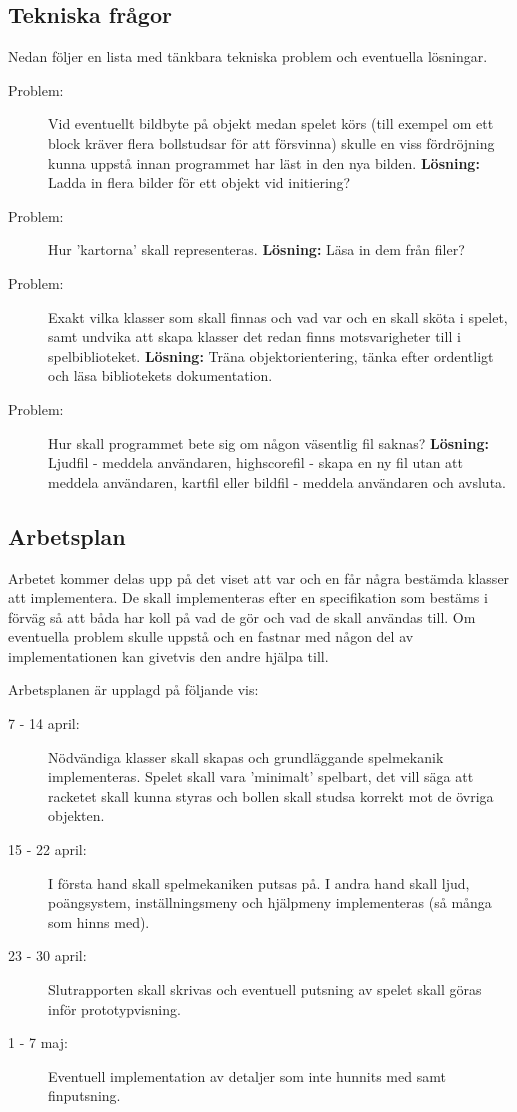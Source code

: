 \documentclass[11pt,a4paper]{article}
\begin{document}
\subsection{Tekniska frågor}
Nedan följer en lista med tänkbara tekniska problem och eventuella lösningar.
\begin{description}
	\item[Problem:] Vid eventuellt bildbyte på objekt medan spelet körs (till exempel om ett block kräver flera bollstudsar för att försvinna) skulle en viss fördröjning kunna uppstå innan programmet har läst in den nya bilden. \textbf{Lösning:} Ladda in flera bilder för ett objekt vid initiering?
	\item[Problem:] Hur 'kartorna' skall representeras. \textbf{Lösning:} Läsa in dem från filer?
	\item[Problem:] Exakt vilka klasser som skall finnas och vad var och en skall sköta i spelet, samt undvika att skapa klasser det redan finns motsvarigheter till i spelbiblioteket. \textbf{Lösning:} Träna objektorientering, tänka efter ordentligt och läsa bibliotekets dokumentation.
	\item[Problem:] Hur skall programmet bete sig om någon väsentlig fil saknas? \textbf{Lösning:} Ljudfil - meddela användaren, highscorefil - skapa en ny fil utan att meddela användaren, kartfil eller bildfil - meddela användaren och avsluta.
\end{description}

\subsection{Arbetsplan}
Arbetet kommer delas upp på det viset att var och en får några bestämda klasser att implementera. De skall implementeras efter en specifikation som bestäms i förväg så att båda har koll på vad de gör och vad de skall användas till. Om eventuella problem skulle uppstå och en fastnar med någon del av implementationen kan givetvis den andre hjälpa till.

Arbetsplanen är upplagd på följande vis:

\begin{description}
	\item[7 - 14 april:] Nödvändiga klasser skall skapas och grundläggande spelmekanik implementeras. Spelet skall vara 'minimalt' spelbart, det vill säga att racketet skall kunna styras och bollen skall studsa korrekt mot de övriga objekten.
	\item[15 - 22 april:] I första hand skall spelmekaniken putsas på. I andra hand skall ljud, poängsystem, inställningsmeny och hjälpmeny implementeras (så många som hinns med).
	\item[23 - 30 april:] Slutrapporten skall skrivas och eventuell putsning av spelet skall göras inför prototypvisning.
	\item[1 - 7 maj:] Eventuell implementation av detaljer som inte hunnits med samt finputsning.
\end{description}
\end{document}

